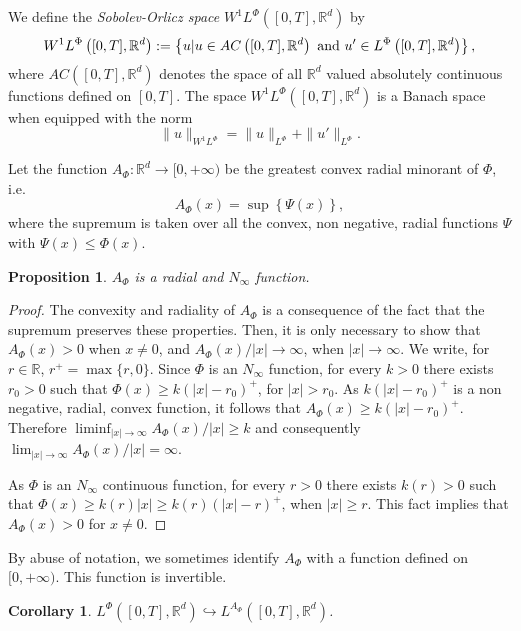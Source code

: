\documentclass[twoside]{article}
\newtheorem{cor}[thm]{Corollary}
\newtheorem{prop}[thm]{Proposition}
\theoremstyle{remark}
\newcommand{\orlnor}{\|_{L^{\Phi}}}
\newcommand{\lphi}{L^{\Phi}}
\newcommand{\wphi}{W^{1}\lphi}
\newcommand{\rr}{\mathbb{R}}
\renewcommand{\leq}{\leqslant}
\renewcommand{\geq}{\geqslant}
\begin{document}
We define the \emph{Sobolev-Orlicz space} $\wphi\left([0,T],\rr^d\right)$ by
\[\wphi\left([0,T],\rr^d\right):=\left\{u| u\in AC\left([0,T],\rr^d\right) \hbox{ and } u'\in \lphi\left([0,T],\rr^d\right)\right\},\]
where $AC\left([0,T],\rr^d\right)$ denotes the space of all $\rr^d$ valued absolutely continuous functions defined on $[0,T]$. The space $\wphi\left([0,T],\rr^d\right)$ is a Banach space when equipped with the norm
\begin{equation}\label{def-norma-orlicz-sob}
\|  u  \|_{\wphi}= \|  u  \|_{\lphi} + \|u'\orlnor.
\end{equation}


Let the function $A_{\Phi}:\rr^d\to [0,+\infty)$ be the greatest convex radial minorant of $\Phi$, i.e.
\begin{equation}\label{eq:inversa-gral}
A_{\Phi}(x)=\sup\left\{\Psi(x) \right\},
\end{equation}
where the supremum is taken over all the convex, non negative, radial functions $\Psi$ with $\Psi(x)\leq \Phi(x)$.

\begin{prop}\label{prop:AsubPhi}  $A_{\Phi}$ is a radial and $N_{\infty}$ function.
\end{prop}

\begin{proof} The convexity and radiality of $A_{\Phi}$ is a consequence of the fact that the supremum preserves these properties. Then, it is only necessary to show that $A_{\Phi}(x)>0$ when $x\neq 0$, and  $A_{\Phi}(x)/|x|\to\infty$, when $|x|\to\infty$. We write, for $r\in\rr$, $r^+=\max\{r,0\}$. Since $\Phi$ is an $N_{\infty}$ function,  for every $k>0$ there exists $r_0>0$ such that  $\Phi(x)\geq k(|x|-r_0)^+$, for $|x|>r_0$.  As $ k(|x|-r_0)^+$ is a non negative, radial, convex function, it follows that $A_{\Phi}(x)\geq k(|x|-r_0)^+$. Therefore $\liminf_{|x|\to\infty} A_{\Phi}(x)/|x|\geq k$ and consequently   $\lim_{|x|\to\infty} A_{\Phi}(x)/|x|=\infty$.

As $\Phi$ is an
$N_{\infty}$ continuous function, for every $r>0$ there exists $k(r)>0$ such that $\Phi(x)\geq k(r)|x|\geq k(r)(|x|-r)^+$, when $|x|\geq r$. This fact implies that $A_{\Phi}(x)>0$ for $x\neq 0$.
\end{proof}
By abuse of notation, we sometimes identify $A_{\Phi}$ with a function defined on $[0,+\infty)$.  This function is invertible.
\begin{cor}\label{cor:incr_aphi} $\lphi([0,T],\rr^d) \hookrightarrow L^{A_{\Phi}}([0,T],\rr^d)$.

\end{cor}
\end{document}
